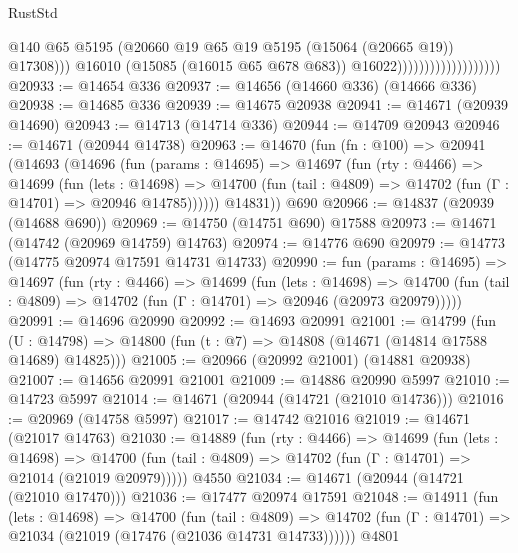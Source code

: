 \begin{lexlean}{RustStd}
\begin{coremodule}
                                              @140
                                              @65
                                              @5195
                                              (@20660
                                                @19
                                                @65
                                                @19
                                                @5195
                                                (@15064 (@20665 @19))
                                                @17308)))
                                          @16010
                                          (@15085 (@16015 @65 @678 @683))
                                          @16022)))))))))))))))))))
@20933 := @14654 @336
@20937 := @14656 (@14660 @336) (@14666 @336)
@20938 := @14685 @336
@20939 := @14675 @20938
@20941 := @14671 (@20939 @14690)
@20943 := @14713 (@14714 @336)
@20944 := @14709 @20943
@20946 := @14671 (@20944 @14738)
@20963 := @14670
    (fun (fn : @100) =>
    @20941
      (@14693
        (@14696
          (fun (params : @14695) =>
          @14697
            (fun (rty : @4466) =>
            @14699
              (fun (lets : @14698) =>
              @14700 (fun (tail : @4809) => @14702 (fun (Γ : @14701) => @20946 @14785))))))
        @14831))
    @690
@20966 := @14837 (@20939 (@14688 @690))
@20969 := @14750 (@14751 @690) @17588
@20973 := @14671 (@14742 (@20969 @14759) @14763)
@20974 := @14776 @690
@20979 := @14773 (@14775 @20974 @17591 @14731 @14733)
@20990 := fun (params : @14695) =>
  @14697
    (fun (rty : @4466) =>
    @14699
      (fun (lets : @14698) =>
      @14700 (fun (tail : @4809) => @14702 (fun (Γ : @14701) => @20946 (@20973 @20979)))))
@20991 := @14696 @20990
@20992 := @14693 @20991
@21001 := @14799
    (fun (U : @14798) => @14800 (fun (t : @7) => @14808 (@14671 (@14814 @17588 @14689) @14825)))
@21005 := @20966 (@20992 @21001) (@14881 @20938)
@21007 := @14656 @20991 @21001
@21009 := @14886 @20990 @5997
@21010 := @14723 @5997
@21014 := @14671 (@20944 (@14721 (@21010 @14736)))
@21016 := @20969 (@14758 @5997)
@21017 := @14742 @21016
@21019 := @14671 (@21017 @14763)
@21030 := @14889
    (fun (rty : @4466) =>
    @14699
      (fun (lets : @14698) =>
      @14700 (fun (tail : @4809) => @14702 (fun (Γ : @14701) => @21014 (@21019 @20979)))))
    @4550
@21034 := @14671 (@20944 (@14721 (@21010 @17470)))
@21036 := @17477 @20974 @17591
@21048 := @14911
    (fun (lets : @14698) =>
    @14700
      (fun (tail : @4809) =>
      @14702 (fun (Γ : @14701) => @21034 (@21019 (@17476 (@21036 @14731 @14733))))))
    @4801

\end{coremodule}
\end{lexlean}

